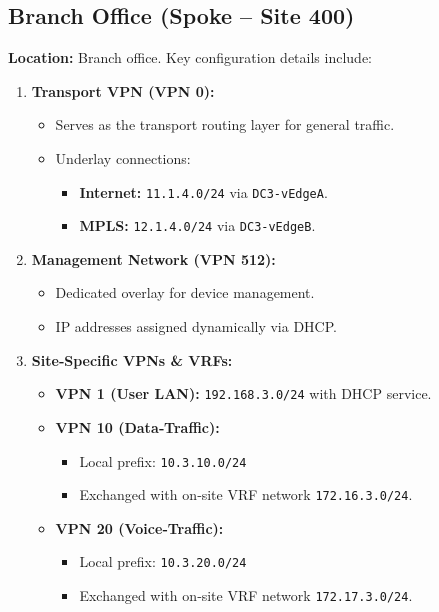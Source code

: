 \documentclass[12pt,english]{report}
\begin{document}
\subsection{Branch Office (Spoke – Site 400)}
\textbf{Location:} Branch office.
Key configuration details include:
\begin{enumerate}
    \item \textbf{Transport VPN (VPN 0):}
    \begin{itemize}
        \item Serves as the transport routing layer for general traffic.
        \item Underlay connections:
        \begin{itemize}
            \item \textbf{Internet:} \texttt{11.1.4.0/24} via \texttt{DC3‑vEdgeA}.
            \item \textbf{MPLS:} \texttt{12.1.4.0/24} via \texttt{DC3‑vEdgeB}.
        \end{itemize}
    \end{itemize}

    \item \textbf{Management Network (VPN 512):}
    \begin{itemize}
        \item Dedicated overlay for device management.
        \item IP addresses assigned dynamically via DHCP.
    \end{itemize}

    \item \textbf{Site‑Specific VPNs \& VRFs:}
    \begin{itemize}
        \item \textbf{VPN 1 (User LAN):} \texttt{192.168.3.0/24} with DHCP service.
        \item \textbf{VPN 10 (Data‑Traffic):}  
        \begin{itemize}
            \item Local prefix: \texttt{10.3.10.0/24}  
            \item Exchanged with on‑site VRF network \texttt{172.16.3.0/24}.
        \end{itemize}
        \item \textbf{VPN 20 (Voice‑Traffic):}  
        \begin{itemize}
            \item Local prefix: \texttt{10.3.20.0/24}  
            \item Exchanged with on‑site VRF network \texttt{172.17.3.0/24}.
        \end{itemize}
    \end{itemize}


\end{enumerate}
\end{document}
